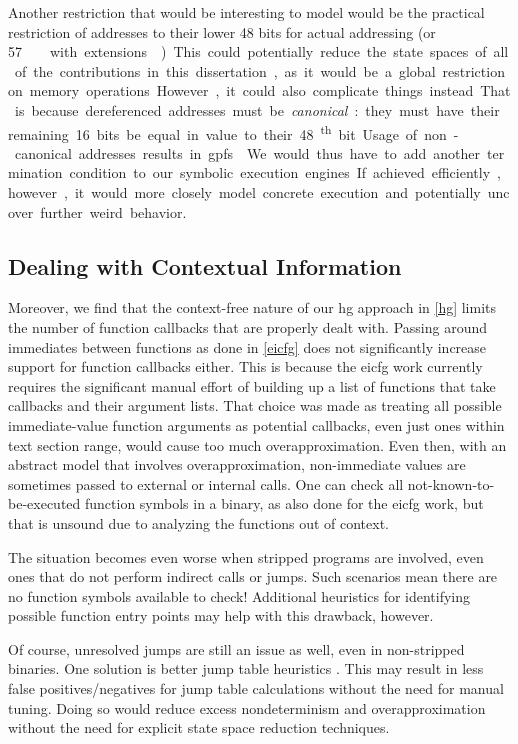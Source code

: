 Another restriction that would be interesting to model would be the practical restriction of addresses to their lower 48 bits for actual addressing (or \SI{57}\bit\ with extensions \autocite{la57}).
This could potentially reduce the state spaces of all of the contributions in this dissertation, as it would be a global restriction on memory operations.
However, it could also complicate things instead.
That is because dereferenced addresses must be \emph{canonical}: they must have their remaining 16 bits be equal in value to their 48\textsuperscript{th} bit.
Usage of non-canonical addresses results in \glspl{gpf} \autocite{intel2019manual}.
We would thus have to add another termination condition to our symbolic execution engines.
If achieved efficiently, however, it would more closely model concrete execution and potentially uncover further weird behavior.

\subsection{Dealing with Contextual Information}
Moreover, we find that the context-free nature of our \gls{hg} approach in \cref{hg} limits the number of function callbacks that are properly dealt with.
Passing around immediates between functions as done in \cref{eicfg} does not significantly increase support for function callbacks either.
This is because the \gls{eicfg} work currently requires the significant manual effort of building up a list of functions that take callbacks and their argument lists.
That choice was made as treating all possible immediate-value function arguments as potential callbacks, even just ones within text section range, would cause too much overapproximation.
Even then, with an abstract model that involves overapproximation, non-immediate values are sometimes passed to external or internal calls.
One can check all not-known-to-be-executed function symbols in a binary, as also done for the \gls{eicfg} work, but that is unsound due to analyzing the functions out of context.

The situation becomes even worse when stripped programs are involved, even ones that do not perform indirect calls or jumps.
Such scenarios mean there are no function symbols available to check!
Additional heuristics for identifying possible function entry points \autocite{bao2014byteweight,pe2020probabilistic}
may help with this drawback, however.

Of course, unresolved jumps are still an issue as well, even in non-stripped binaries.
One solution is better jump table heuristics \autocite{cifuentes2001recovery,flexeder2010reconstruction,gedich2015switch,an2022dsv}.
This may result in less false positives/negatives for jump table calculations without the need for manual tuning.
Doing so would reduce excess nondeterminism and overapproximation without the need for explicit state space reduction techniques.

